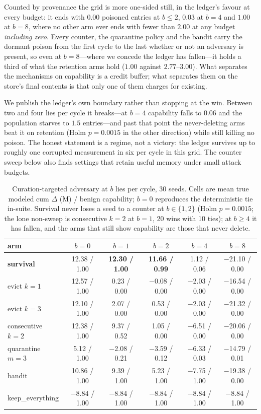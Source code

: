 Counted by provenance the grid is more one-sided still, in the ledger's
favour at every budget: it ends with $0.00$ poisoned entries at $b \le 2$,
$0.03$ at $b{=}4$ and $1.00$ at $b{=}8$, where no other arm ever ends with
fewer than $2.00$ at any budget \emph{including zero}. Every counter, the
quarantine policy and the bandit carry the dormant poison from the first
cycle to the last whether or not an adversary is present, so even at
$b{=}8$---where we concede the ledger has fallen---it holds a third of
what the retention arms hold ($1.00$ against $2.77$--$3.00$). What
separates the mechanisms on capability is a credit buffer; what separates
them on the store's final contents is that only one of them charges for
existing.

We publish the ledger's own boundary rather than stopping at the win.
Between two and four lies per cycle it breaks---at $b{=}4$ capability
falls to $0.06$ and the population starves to $1.5$ entries---and past
that point the never-deleting arms beat it on retention (Holm
$p = 0.0015$ in the other direction) while still killing no poison. The
honest statement is a regime, not a victory: the ledger survives up to roughly one corrupted measurement in six per
cycle in this grid. The counter sweep below also finds settings that
retain useful memory under small attack budgets.

\begin{table}[t]
\centering
\tabsize
\caption{Curation-targeted adversary at $b$ lies per cycle, 30 seeds.
Cells are mean true modeled cum $\Delta$ (M) / benign capability; $b{=}0$
reproduces the deterministic tie in-suite. Survival never loses a seed to
a counter at $b{\in}\{1,2\}$ (Holm $p = 0.0015$; the lone non-sweep is
consecutive $k{=}2$ at $b{=}1$, 20 wins with 10 ties); at $b{\ge}4$ it
has fallen, and the arms that still show capability are those that never
delete.}
\label{tab:adversary}
\begin{tabular}{lccccc}
\toprule
arm & $b{=}0$ & $b{=}1$ & $b{=}2$ & $b{=}4$ & $b{=}8$ \\
\midrule
\textbf{survival}     & 12.38 / 1.00 & \textbf{12.30 / 1.00} & \textbf{11.66 / 0.99} & 1.12 / 0.06 & $-$21.10 / 0.00 \\
evict $k{=}1$         & 12.57 / 1.00 & 0.23 / 0.00  & $-$0.08 / 0.00 & $-$2.03 / 0.00 & $-$16.54 / 0.00 \\
evict $k{=}3$         & 12.10 / 1.00 & 2.07 / 0.00  & 0.53 / 0.00    & $-$2.03 / 0.00 & $-$21.32 / 0.00 \\
consecutive $k{=}2$   & 12.38 / 1.00 & 9.37 / 0.52  & 1.05 / 0.00    & $-$6.51 / 0.00 & $-$20.06 / 0.00 \\
quarantine $m{=}3$    & 5.12 / 1.00  & $-$2.08 / 0.21 & $-$3.59 / 0.12 & $-$6.33 / 0.03 & $-$14.79 / 0.01 \\
bandit                & 10.86 / 1.00 & 9.39 / 1.00  & 5.23 / 1.00    & $-$7.75 / 1.00 & $-$19.38 / 0.00 \\
keep\_everything      & $-$8.84 / 1.00 & $-$8.84 / 1.00 & $-$8.84 / 1.00 & $-$8.84 / 1.00 & $-$8.84 / 1.00 \\
\bottomrule
\end{tabular}
\end{table}

